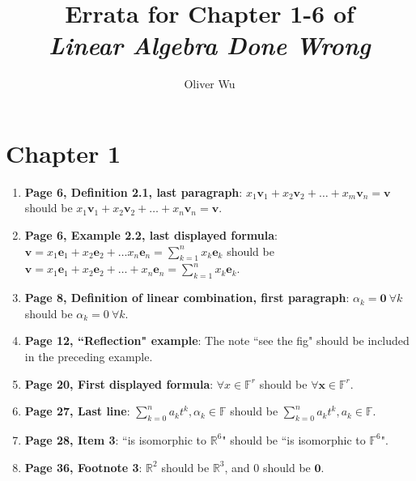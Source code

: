 \documentclass{article}
\title{Errata for Chapter 1-6 of \\ {\it Linear Algebra Done Wrong}}
\author{Oliver Wu}
\begin{document}
\maketitle

\section*{Chapter 1}
\begin{enumerate}[leftmargin=*]
    \item \textbf{Page 6, Definition 2.1, last paragraph}: 
          $x_{1}\mathbf{v}_{1}+x_{2}\mathbf{v}_{2}+\ldots+x_{m}\mathbf{v}_{n}=\mathbf{v}$ should be 
          $x_{1}\mathbf{v}_{1}+x_{2}\mathbf{v}_{2}+\ldots+x_{n}\mathbf{v}_{n}=\mathbf{v}$.
    
    \item \textbf{Page 6, Example 2.2, last displayed formula}: 
          $\mathbf{v}=x_1\mathbf{e}_1+x_2\mathbf{e}_2+\ldots x_n\mathbf{e}_n=\sum_{k=1}^nx_k\mathbf{e}_k$ should be 
          $\mathbf{v}=x_1\mathbf{e}_1+x_2\mathbf{e}_2+\ldots +x_n\mathbf{e}_n=\sum_{k=1}^nx_k\mathbf{e}_k$.
    
    \item \textbf{Page 8, Definition of linear combination, first paragraph}: 
          $\alpha_{k}=\mathbf{0}\ \forall k$ should be $\alpha_{k}=0\ \forall k$.
    
    \item \textbf{Page 12, ``Reflection" example}: 
          The note ``see the fig" should be included in the preceding example.
    
    \item \textbf{Page 20, First displayed formula}: 
          $\forall {x}\in\mathbb{F}^r$ should be $\forall \mathbf{x}\in\mathbb{F}^r$.
    
    \item \textbf{Page 27, Last line}: 
          $\sum_{k=0}^{n}a_{k}t^{k},\alpha_{k}\in\mathbb{F}$ should be 
          $\sum_{k=0}^{n}a_{k}t^{k},a_{k}\in\mathbb{F}$.
    
    \item \textbf{Page 28, Item 3}: 
          ``is isomorphic to $\mathbb{R}^6$" should be ``is isomorphic to $\mathbb{F}^6$".
    
    \item \textbf{Page 36, Footnote 3}: 
          $\mathbb{R}^2$ should be $\mathbb{R}^3$, and $0$ should be $\mathbf{0}$.
\end{enumerate}
\end{document}
